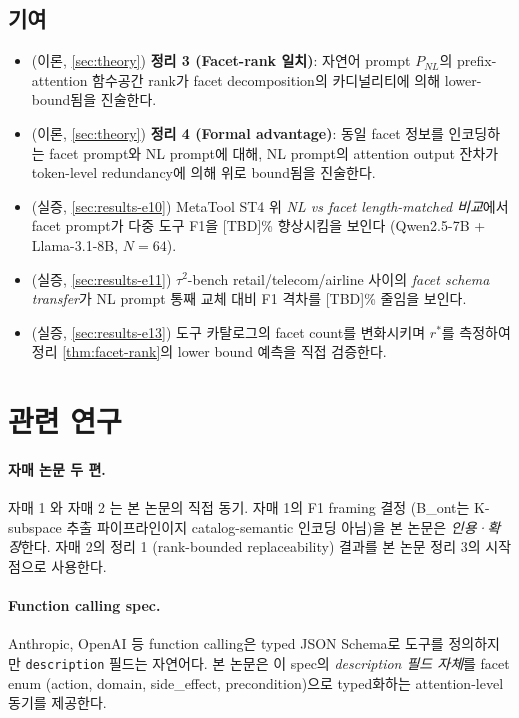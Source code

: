 \documentclass[11pt]{article}
\theoremstyle{plain}
\theoremstyle{definition}
\theoremstyle{remark}
\begin{document}
\subsection{기여}
\label{sec:contrib}

\begin{itemize}[leftmargin=*]
\item (이론, \cref{sec:theory}) \textbf{정리 3 (Facet-rank 일치)}: 자연어 prompt $P_{NL}$의 prefix-attention 함수공간 rank가 facet decomposition의 카디널리티에 의해 lower-bound됨을 진술한다.
\item (이론, \cref{sec:theory}) \textbf{정리 4 (Formal advantage)}: 동일 facet 정보를 인코딩하는 facet prompt와 NL prompt에 대해, NL prompt의 attention output 잔차가 token-level redundancy에 의해 위로 bound됨을 진술한다.
\item (실증, \cref{sec:results-e10}) MetaTool ST4 위 \emph{NL vs facet length-matched 비교}에서 facet prompt가 다중 도구 F1을 [TBD]\% 향상시킴을 보인다 (Qwen2.5-7B + Llama-3.1-8B, $N{=}64$).
\item (실증, \cref{sec:results-e11}) $\tau^2$-bench retail/telecom/airline 사이의 \emph{facet schema transfer}가 NL prompt 통째 교체 대비 F1 격차를 [TBD]\% 줄임을 보인다.
\item (실증, \cref{sec:results-e13}) 도구 카탈로그의 facet count를 변화시키며 $r^*$를 측정하여 정리 \ref{thm:facet-rank}의 lower bound 예측을 직접 검증한다.
\end{itemize}

\section{관련 연구}
\label{sec:related}

\paragraph{자매 논문 두 편.} 자매 1 \citep{sibling2027argmax}와 자매 2 \citep{sibling2027prompt}는 본 논문의 직접 동기. 자매 1의 F1 framing 결정 (B\_ont는 K-subspace 추출 파이프라인이지 catalog-semantic 인코딩 아님)을 본 논문은 \emph{인용·확장}한다. 자매 2의 정리 1 (rank-bounded replaceability) 결과를 본 논문 정리 3의 시작점으로 사용한다.

\paragraph{Function calling spec.}
Anthropic, OpenAI 등 function calling은 typed JSON Schema로 도구를 정의하지만 \texttt{description} 필드는 자연어다. 본 논문은 이 spec의 \emph{description 필드 자체}를 facet enum (action, domain, side\_effect, precondition)으로 typed화하는 attention-level 동기를 제공한다.
\end{document}
